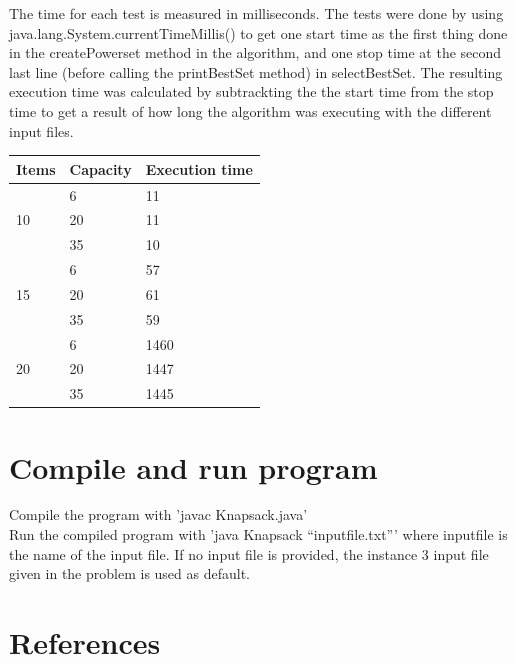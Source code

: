 \documentclass{inc/mas}
\begin{document}
The time for each test is measured in milliseconds. The tests were done by using java.lang.System.currentTimeMillis() to get one start time as the first thing done in the createPowerset method in the algorithm, and one stop time at the second last line (before calling the printBestSet method) in selectBestSet. The resulting execution time was calculated by subtrackting the the start time from the stop time to get a result of how long the algorithm was executing with the different input files.\\

\begin{tabular}{|l|l|l|} \hline
Items &Capacity &Execution time\\ \hline
\multirow{3}{*}{10} & 6 & 11 \\
& 20 & 11 \\
& 35 & 10 \\ \hline
\multirow{3}{*}{15} & 6 & 57 \\
& 20 & 61 \\
& 35 & 59 \\ \hline
\multirow{3}{*}{20} & 6 & 1460 \\
& 20 & 1447 \\
& 35 & 1445 \\ \hline
\end{tabular}

\appendix
\section{Compile and run program}
\noindent Compile the program with 'javac Knapsack.java'\\ 
\noindent Run the compiled program with 'java Knapsack ``inputfile.txt''' where inputfile is the name of the input file. If no input file is provided, the instance 3 input file given in the problem is used as default. 

\section{References}



%
\end{document}
